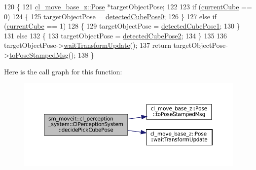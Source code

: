 \begin{DoxyCode}
120     \{
121         \hyperlink{classcl__move__base__z_1_1Pose}{cl\_move\_base\_z::Pose} *targetObjectPose;
122 
123         \textcolor{keywordflow}{if} (\hyperlink{classsm__moveit_1_1cl__perception__system_1_1ClPerceptionSystem_a0ffeadfa41480c9d4d0fcc509237dff6}{currentCube} == 0)
124         \{
125             targetObjectPose = \hyperlink{classsm__moveit_1_1cl__perception__system_1_1ClPerceptionSystem_a4bf0838041a73d41008c2cb2daa6fb63}{detectedCubePose0};
126         \}
127         \textcolor{keywordflow}{else} \textcolor{keywordflow}{if} (\hyperlink{classsm__moveit_1_1cl__perception__system_1_1ClPerceptionSystem_a0ffeadfa41480c9d4d0fcc509237dff6}{currentCube} == 1)
128         \{
129             targetObjectPose = \hyperlink{classsm__moveit_1_1cl__perception__system_1_1ClPerceptionSystem_ae09f06cb609d0a233fa9a0d31dcb09c6}{detectedCubePose1};
130         \}
131         \textcolor{keywordflow}{else}
132         \{
133             targetObjectPose = \hyperlink{classsm__moveit_1_1cl__perception__system_1_1ClPerceptionSystem_a92801878ea69fb584f459a502bb77dad}{detectedCubePose2};
134         \}
135 
136         targetObjectPose->\hyperlink{classcl__move__base__z_1_1Pose_a5f8576c3dacfb2f2e7f9df5105c480ea}{waitTransformUpdate}();
137         \textcolor{keywordflow}{return} targetObjectPose->\hyperlink{classcl__move__base__z_1_1Pose_a63887a88c1ac6e9a4a71b8d7d11aed6c}{toPoseStampedMsg}();
138     \}
\end{DoxyCode}
Here is the call graph for this function\+:
\nopagebreak
\begin{figure}[H]
\begin{center}
\leavevmode
\includegraphics[width=350pt]{classsm__moveit_1_1cl__perception__system_1_1ClPerceptionSystem_a29beb46b44dbf5617027a6d0e3990037_cgraph}
\end{center}
\end{figure}
\mbox{\label{classsm__moveit_1_1cl__perception__system_1_1ClPerceptionSystem_a354f357ec7bc5438e7eeab2006868261}} 
